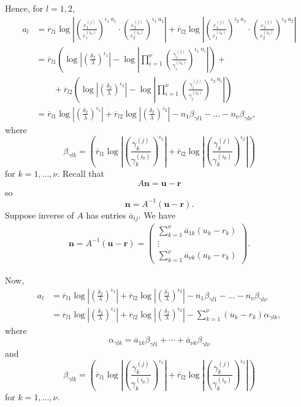 Hence, for $l =1,2$,
\begin{align*}
a_l	& = \overline{r}_{l1}\log\left|\left(\frac{\varepsilon_1^{(j)}}{\varepsilon_1^{(i_0)}}\right)^{\iota_1 \ a_1} 		\cdot \left(\frac{\varepsilon_2^{(j)}}{\varepsilon_2^{(i_0)}}\right)^{\iota_1 \ a_2}\right| + 
	\overline{r}_{l2}\log\left|\left(\frac{\varepsilon_1^{(j)}}{\varepsilon_1^{(i_0)}}\right)^{\iota_2\ a_1}
	\cdot \left(\frac{\varepsilon_2^{(j)}}{\varepsilon_2^{(i_0)}}\right)^{\iota_2 \ a_2}\right|\\
	& = \overline{r}_{l1}\left( \log\left|\left(\frac{\delta_2}{\lambda}\right)^{\iota_1}\right| - \log\left| \prod_{i = 1}^{\nu} \left( \frac{\gamma_i^{(j)}}{\gamma_i^{(i_0)}}\right)^{\iota_1 \ n_i}\right|\right) + \\ 
	& \quad \quad + \overline{r}_{l2}\left( \log\left|\left(\frac{\delta_2}{\lambda}\right)^{\iota_2}\right| - \log\left| \prod_{i = 1}^{\nu} \left( \frac{\gamma_i^{(j)}}{\gamma_i^{(i_0)}}\right)^{\iota_2 \ n_i}\right|\right)\\
	& = \overline{r}_{l1}\log\left|\left(\frac{\delta_2}{\lambda}\right)^{\iota_1}\right| + \overline{r}_{l2}\log\left|\left(\frac{\delta_2}{\lambda}\right)^{\iota_2}\right| - n_1\beta_{\gamma l 1} - \dots - n_{\nu}\beta_{\gamma l \nu},
\end{align*}
where
\[\beta_{\gamma l k} = \left(\overline{r}_{l1} \log\left| \left( \frac{\gamma_k^{(j)}}{\gamma_k^{(i_0)}}\right)^{\iota_1}\right|+ \overline{r}_{l2}\log\left| \left( \frac{\gamma_k^{(j)}}{\gamma_k^{(i_0)}}\right)^{\iota_2}\right|\right)\]
for $k = 1, \dots, \nu$. Recall that 
\[A\mathbf{n} = \mathbf{u} - \mathbf{r}\]
so
\[\mathbf{n} = A^{-1}(\mathbf{u} - \mathbf{r}).\]
Suppose inverse of $A$ has entries $\overline{a}_{ij}$. We have
\begin{align*}
\mathbf{n}  = A^{-1}(\mathbf{u} - \mathbf{r})
	 = \begin{pmatrix} \sum_{k=1}^{\nu} \overline{a}_{1k}(u_k-r_k)\\  \vdots \\ \sum_{k=1}^{\nu} \overline{a}_{\nu k}(u_k-r_k) \end{pmatrix}.
\end{align*}

Now, 
\begin{align*}
a_l 	& = \overline{r}_{l1}\log\left|\left(\frac{\delta_2}{\lambda}\right)^{\iota_1}\right| + \overline{r}_{l2}\log\left|\left(\frac{\delta_2}{\lambda}\right)^{\iota_2}\right| - n_1\beta_{\gamma l 1} - \dots - n_{\nu}\beta_{\gamma l \nu}\\
	& = \overline{r}_{l1}\log\left|\left(\frac{\delta_2}{\lambda}\right)^{\iota_1}\right| + \overline{r}_{l2}\log\left|\left(\frac{\delta_2}{\lambda}\right)^{\iota_2}\right| - \sum_{k=1}^{\nu}(u_k-r_k)\alpha_{\gamma l k},
\end{align*}
where
\[\alpha_{\gamma l k} = \overline{a}_{1k}\beta_{\gamma l 1} + \cdots + \overline{a}_{\nu k}\beta_{\gamma l \nu}\]
and
\[\beta_{\gamma l k} = \left(\overline{r}_{l1} \log\left| \left( \frac{\gamma_k^{(j)}}{\gamma_k^{(i_0)}}\right)^{\iota_1}\right|+ \overline{r}_{l2}\log\left| \left( \frac{\gamma_k^{(j)}}{\gamma_k^{(i_0)}}\right)^{\iota_2}\right|\right)\]
for $k = 1, \dots, \nu$.

